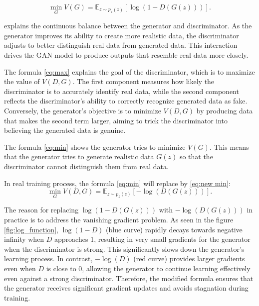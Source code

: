 \begin{equation}
    \label{eq:min}
    \min_{G} V(G) = \mathbb{E}_{z \sim p_{z}(z)} [\log(1 - D(G(z)))].
\end{equation}

explains the continuous balance between the generator and discriminator. 
As the generator improves its ability to create more realistic data, 
the discriminator adjusts to better distinguish real data from generated data. 
This interaction drives the GAN model to produce outputs that resemble real data more closely.

 
The formula \eqref{eq:max} explains the goal of the discriminator, which is to maximize the value of $V(D, G)$. The first component measures how 
likely the discriminator is to accurately identify real data, while the second component reflects the discriminator’s 
ability to correctly recognize generated data as fake. Conversely, the generator’s objective is to minimize $V(D, G)$ 
by producing data that makes the second term larger, aiming to trick the discriminator into believing the generated data is genuine.


The formula \eqref{eq:min} shows the generator tries to minimize $V(G)$. 
This means that the generator tries to generate realistic data $G(z)$ so that the discriminator cannot distinguish 
them from real data. 

In real training process, the formula \eqref{eq:min} will replace by \eqref{eq:new min}:
\begin{equation}
    \label{eq:new min}
    \min_{G} V(D, G) = \mathbb{E}_{z \sim p_{z}(z)} [-\log(D(G(z)))].
\end{equation}

The reason for replacing $\log(1 - D(G(z)))$ with $-\log(D(G(z)))$ in practice is to address the vanishing 
gradient problem. As seen in the figure \ref{fig:log_function}, $\log(1 - D)$ (blue curve) rapidly decays towards negative infinity 
when $D$ approaches 1, resulting in very small gradients for the generator when the discriminator is strong. 
This significantly slows down the generator's learning process. In contrast, $-\log(D)$ (red curve) provides 
larger gradients even when $D$ is close to 0, allowing the generator to continue learning effectively even 
against a strong discriminator. Therefore, the modified formula ensures that the generator receives significant 
gradient updates and avoids stagnation during training.

